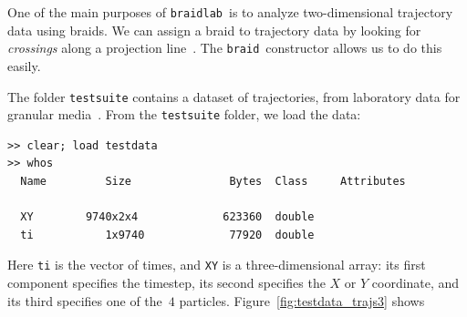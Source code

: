\documentclass[12pt]{article}
\newcommand{\braidlab}{\texttt{braidlab}}%
\newcommand{\braid}{\texttt{braid}}%
\begin{document}
One of the main purposes of \braidlab\ is to analyze two-dimensional
trajectory data using braids.  We can assign a braid to trajectory
data by looking for \emph{crossings} along a projection
line~\citep{Thiffeault2005,Thiffeault2010}.  The \braid\ constructor
allows us to do this easily.

The folder \lstinline{testsuite} contains a dataset of trajectories,
from laboratory data for granular media~\citep{Puckett2012}.  From the
\lstinline{testsuite} folder, we load the data:
\begin{lstlisting}[frame=single,framerule=0pt]
>> clear; load testdata
>> whos
  Name         Size               Bytes  Class     Attributes

  XY        9740x2x4             623360  double              
  ti           1x9740             77920  double              
\end{lstlisting}
Here \lstinline{ti} is the vector of times, and \lstinline{XY} is a
three-dimensional array: its first component specifies the timestep,
its second specifies the $X$ or $Y$ coordinate, and its third
specifies one of the~$4$ particles.  Figure~\ref{fig:testdata_trajs3}
shows
%
\end{document}
